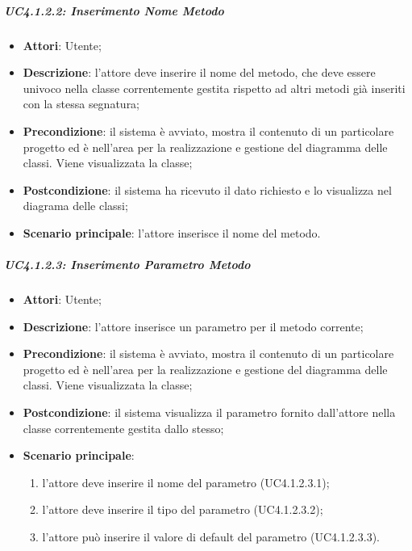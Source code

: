 \subparagraph{UC4.1.2.2: Inserimento Nome Metodo}
\label{UC4.1.2.2}
\begin{itemize}
	\item \textbf{Attori}: Utente;
	\item \textbf{Descrizione}: l'attore deve inserire il nome del metodo, che deve essere univoco nella classe correntemente gestita rispetto ad altri metodi già inseriti con la stessa segnatura;
	\item \textbf{Precondizione}: il sistema è avviato, mostra il contenuto di un particolare progetto ed è nell'area per la realizzazione e gestione del diagramma delle classi. Viene visualizzata la classe;
	\item \textbf{Postcondizione}: il sistema ha ricevuto il dato richiesto e lo visualizza nel diagrama delle classi;
	\item \textbf{Scenario principale}: l'attore inserisce il nome del metodo.
\end{itemize}

\subparagraph{UC4.1.2.3: Inserimento Parametro Metodo}
\label{UC4.1.2.3}
\begin{itemize}
	\item \textbf{Attori}: Utente;
	\item \textbf{Descrizione}: l'attore inserisce un parametro per il metodo corrente;
	\item \textbf{Precondizione}:  il sistema è avviato, mostra il contenuto di un particolare progetto ed è nell'area per la realizzazione e gestione del diagramma delle classi. Viene visualizzata la classe;
	\item \textbf{Postcondizione}: il sistema visualizza il parametro fornito dall'attore nella classe correntemente gestita dallo stesso;
	\item \textbf{Scenario principale}:
	\begin{enumerate}
		\item l'attore deve inserire il nome del parametro (UC4.1.2.3.1);
		\item l'attore deve inserire il tipo del parametro (UC4.1.2.3.2);
		\item l'attore può inserire il valore di default del parametro (UC4.1.2.3.3).
	\end{enumerate}
\end{itemize}

